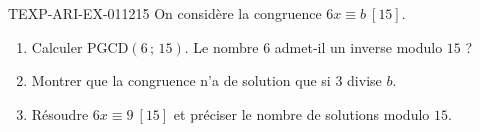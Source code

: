 \begin{exercice}{TEXP-ARI-EX-011}{2}{15}
On considère la congruence $6x\equiv b\ [15]$.
\begin{enumerate}
  \item Calculer $\mathrm{PGCD}(6\,;\,15)$. Le nombre $6$ admet-il un inverse
        modulo $15$ ?
  \item Montrer que la congruence n'a de solution que si $3$ divise $b$.
  \item Résoudre $6x\equiv9\ [15]$ et préciser le nombre de solutions
        modulo $15$.
\end{enumerate}
\end{exercice}
